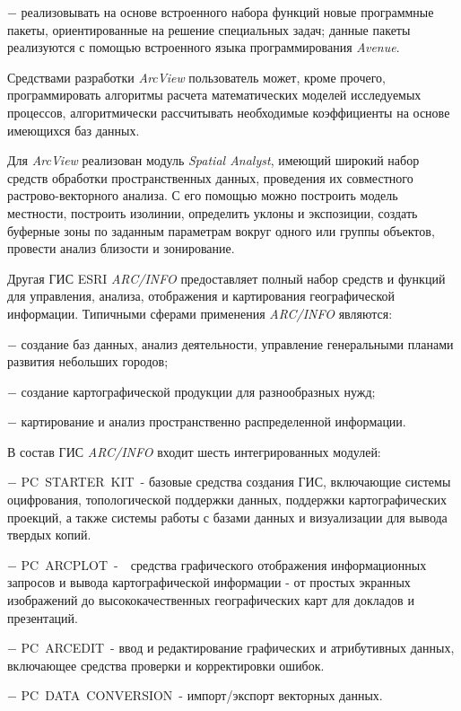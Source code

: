 \documentclass{article}
\begin{document}
\ensuremath{-} реализовывать на основе встроенного 
набора функций новые программные пакеты, ориентированные 
на решение специальных задач; данные пакеты 
реализуются с помощью встроенного языка программирования 
\textit{Avenue}.

Средствами разработки \textit{ArcView} пользователь 
может, кроме прочего, программировать алгоритмы 
расчета математических моделей  исследуемых 
процессов, алгоритмически рассчитывать необходимые 
коэффициенты на основе имеющихся баз данных. 

Для \textit{ArcView} реализован модуль \textit{Spatial Analyst}, 
имеющий широкий набор средств обработки пространственных 
данных, проведения их совместного растрово-векторного 
анализа. С его помощью можно построить модель 
местности, построить изолинии, определить уклоны 
и экспозиции, создать буферные зоны по заданным 
параметрам вокруг одного или группы объектов, 
провести анализ близости и зонирование.

Другая ГИС ESRI \textit{ARC/INFO} предоставляет полный 
набор средств и функций для управления, анализа, 
отображения и картирования географической 
информации. Типичными сферами применения \textit{ARC/INFO} 
являются:

\ensuremath{-} создание баз данных, анализ деятельности, 
управление генеральными планами развития небольших 
городов; 

\ensuremath{-} создание картографической продукции 
для разнообразных нужд; 

\ensuremath{-} картирование и анализ пространственно 
распределенной информации. 

В состав ГИС \textit{ARC/INFO} входит шесть интегрированных 
модулей:

\ensuremath{-} PC~STARTER~KIT~- базовые средства создания 
ГИС, включающие системы оцифрования, топологической 
поддержки данных, поддержки картографических 
проекций, а также системы работы с базами данных 
и визуализации для вывода твердых копий. 

\ensuremath{-} PC~ARCPLOT~-~~средства графического отображения 
информационных запросов и вывода картографической 
информации - от простых экранных изображений 
до высококачественных географических карт 
для докладов и презентаций. 

\ensuremath{-} PC~ARCEDIT~- ввод и редактирование графических 
и атрибутивных данных, включающее средства 
проверки и корректировки ошибок. 

\ensuremath{-} PC~DATA~CONVERSION~- импорт/экспорт векторных 
данных. 
\end{document}
